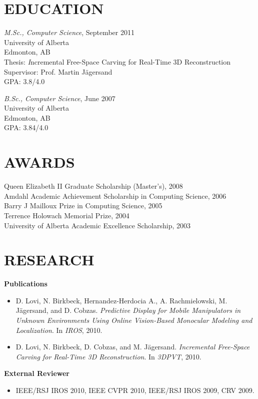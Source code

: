 \documentclass{res}
\begin{document}
\begin{resume}
\section{EDUCATION}
    \textit{M.Sc., Computer Science}, September 2011\\
    University of Alberta\\
    Edmonton, AB\\
    \hspace*{2.5em} Thesis: {\textit Incremental Free-Space Carving for Real-Time 3D Reconstruction}\\
    \hspace*{2.5em} Supervisor: Prof. Martin J{\"a}gersand\\
    \hspace*{2.5em} GPA: 3.8/4.0

    \textit{B.Sc., Computer Science}, June 2007\\
    University of Alberta\\
    Edmonton, AB\\
    \hspace*{2.5em} GPA: 3.84/4.0


\section{AWARDS}
    Queen Elizabeth II Graduate Scholarship (Master's), 2008\\
    Amdahl Academic Achievement Scholarship in Computing Science, 2006\\
    Barry J Mailloux Prize in Computing Science, 2005\\
    Terrence Holowach Memorial Prize, 2004\\
    University of Alberta Academic Excellence Scholarship, 2003


\section{RESEARCH}
    \textbf{Publications}\vspace*{0.666ex}
    \begin{itemize}[label={}, labelsep=*, leftmargin=2.8em]
        \item D. Lovi, N. Birkbeck, Hernandez-Herdocia A., A. Rachmielowski, M. J{\"a}gersand, and D. \hspace*{1.5em}Cobzas.  \textit{Predictive Display for Mobile Manipulators in Unknown Environments Using \hspace*{1.5em}Online Vision-Based Monocular Modeling and Localization}. In \textit{IROS}, 2010.
        \item D. Lovi, N. Birkbeck, D. Cobzas, and M. J{\"a}gersand. \textit{Incremental Free-Space Carving for \hspace*{1.5em}Real-Time 3D Reconstruction}. In \textit{3DPVT}, 2010.
    \end{itemize}
    \textbf{External Reviewer}
    \begin{itemize}[label={}, labelsep=*, leftmargin=2.8em]
    \item IEEE/RSJ IROS 2010, IEEE CVPR 2010, IEEE/RSJ IROS 2009, CRV 2009.
    \end{itemize}



\end{resume}
\end{document}
